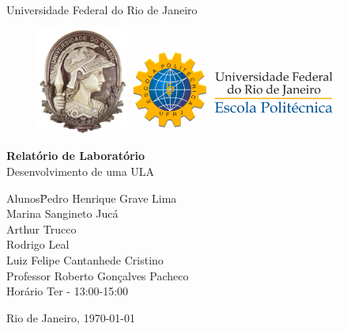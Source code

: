\documentclass[a4paper, 12pt]{article}
\begin{document}

\begin{titlepage}
	\begin{center}
		\huge{Universidade Federal do Rio de Janeiro}

\vspace{10pt}
\begin{figure}[!ht]
\centering
\includegraphics[width=3cm]{minerva.eps}
\hspace{3cm}
\includegraphics[height=3cm, width=7cm]{poli-logo.pdf}
\end{figure}
        
        \vspace{85pt}
        
		\textbf{\LARGE{Relatório de Laboratório}}
		\large{\\
        		Desenvolvimento de uma ULA}
		\vspace{160pt}
		
	\end{center}
	
	\begin{flushleft}
		\begin{tabbing}
			Alunos\qquad\qquad\= Pedro Henrique Grave Lima\\
			\>Marina Sangineto Jucá\\
            \> Arthur Trucco\\
            \> Rodrigo Leal \\
            \> Luiz Felipe Cantanhede Cristino \\
			Professor\> Roberto Gonçalves Pacheco \\
			Horário\> Ter - 13:00-15:00\\
		
	\end{tabbing}
		  
	\end{flushleft}
	
	\begin{center}
		\vspace{\fill}
		Rio de Janeiro, \today
	\end{center}
\end{titlepage}
\newpage
\tableofcontents
\thispagestyle{empty}
\end{document}
